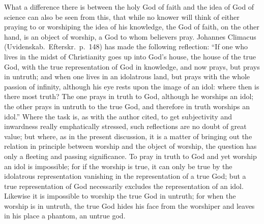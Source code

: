 \documentclass[12pt]{book}
\newcommand{\opage}[1]{\marginnote{\footnotesize\textit{[#1]}}}
\begin{document}
What a difference there is between the holy God of faith and the idea of
God of science can also be seen from this, that while no knower will
think of either praying to
\opage{115}\setcounter{footnote}{0}%
or worshiping the idea of his knowledge, the God of faith, on the other
hand, is an object of worship, a God to whom believers pray. Johannes
Climacus (Uvidenskab.\ Efterskr.\ p.~148) has made the following
reflection: ``If one who lives in the midst of Christianity goes up into
God's house, the house of the true God, with the true representation of
God in knowledge, and now prays, but prays in untruth; and when one
lives in an idolatrous land, but prays with the whole passion of
infinity, although his eye rests upon the image of an idol: where then
is there most truth? The one prays in truth to God, although he worships
an idol; the other prays in untruth to the true God, and therefore in
truth worships an idol.'' Where the task is, as with the author cited,
to get subjectivity and inwardness really emphatically stressed, such
reflections are no doubt of great value; but where, as in the present
discussion, it is a matter of bringing out the relation in principle
between worship and the object of worship, the question has only a
fleeting and passing significance. To pray in truth to God and yet
worship an idol is impossible; for if the worship is true, it can only be
true by the idolatrous representation vanishing in the representation of
a true God; but a true representation of God necessarily excludes the
representation of an idol. Likewise it is impossible to worship the true
God in untruth; for when the worship is in untruth, the true God hides
his face from the worshiper and leaves in his place a phantom, an untrue
god.
\end{document}
